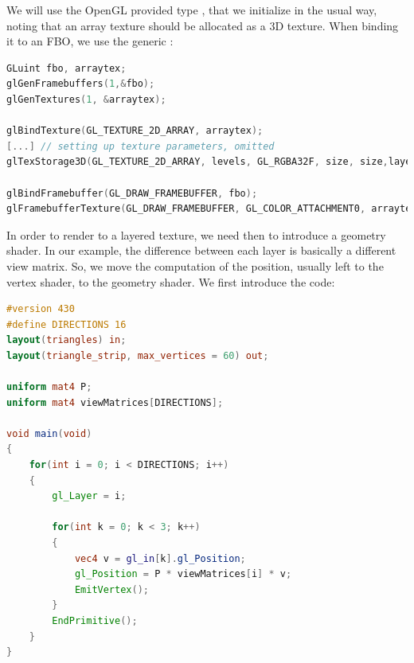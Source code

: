 We will use the OpenGL provided type , that we initialize in the usual way, noting that an array texture should be allocated as a 3D texture. When binding it to an FBO, we use the generic :
\begin{lstlisting}[language=C++,label=lst:initarraytexture,caption={Initializing array texture. Note that the number of layers is passed to the \gl{glTexStorage3D} command.}]
GLuint fbo, arraytex;
glGenFramebuffers(1,&fbo);
glGenTextures(1, &arraytex);

glBindTexture(GL_TEXTURE_2D_ARRAY, arraytex);
[...] // setting up texture parameters, omitted
glTexStorage3D(GL_TEXTURE_2D_ARRAY, levels, GL_RGBA32F, size, size,layers);

glBindFramebuffer(GL_DRAW_FRAMEBUFFER, fbo);
glFramebufferTexture(GL_DRAW_FRAMEBUFFER, GL_COLOR_ATTACHMENT0, arraytex, 0);
\end{lstlisting}
In order to render to a layered texture, we need then to introduce a geometry shader. In our example, the difference between each layer is basically a different view matrix. So, we move the computation of the position, usually left to the vertex shader, to the geometry shader. We first introduce the code:

\begin{lstlisting}[language=GLSL,label=lst:arraygeomshader,caption={Geometry shader for layered rendering. The multiplication by the model matrix of vertex v is performed in the vertex shader (not shown).}]
#version 430
#define DIRECTIONS 16
layout(triangles) in;
layout(triangle_strip, max_vertices = 60) out;

uniform mat4 P;
uniform mat4 viewMatrices[DIRECTIONS];

void main(void)
{
    for(int i = 0; i < DIRECTIONS; i++)
    {
        gl_Layer = i;

        for(int k = 0; k < 3; k++)
        {
            vec4 v = gl_in[k].gl_Position;
            gl_Position = P * viewMatrices[i] * v;
            EmitVertex();
        }
        EndPrimitive();
    }
}
\end{lstlisting}

